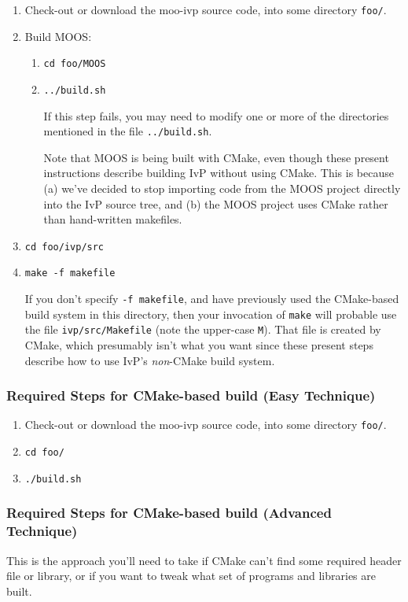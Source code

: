 \documentclass[letterpaper,10pt]{article}
\begin{document}
\begin{enumerate}
 \item Check-out or download the moo-ivp source code, into some directory \verb|foo/|.
 \item Build MOOS:
 \begin{enumerate}
  \renewcommand{\labelenumii}{\arabic{enumi}.\arabic{enumii}.}
   \item \verb|cd foo/MOOS|
   \item \verb|../build.sh|

	If this step fails, you may need to modify one or more of the directories
	mentioned in the file \verb|../build.sh|.

	Note that MOOS is being built with CMake, even though these present instructions
	describe building IvP without using CMake.  This is because (a) we've decided to
	stop importing code from the MOOS project directly into the IvP source tree, and
	(b) the MOOS project uses CMake rather than hand-written makefiles.

 \end{enumerate}

 \item \verb|cd foo/ivp/src|
 \item \verb|make -f makefile|

	If you don't specify \verb|-f makefile|, and have previously used the
	CMake-based build system in this directory, then your invocation of \verb|make|
	will probable use the file \verb|ivp/src/Makefile| (note the upper-case \verb|M|).
	That file is created by CMake, which presumably isn't what you want since these
	present steps describe how to use IvP's \textit{non}-CMake build system.

\end{enumerate}


\subsubsection{Required Steps for CMake-based build (Easy Technique)}
\begin{enumerate}
 \item Check-out or download the moo-ivp source code, into some directory \verb|foo/|.
 \item \verb|cd foo/|
 \item \verb|./build.sh|
\end{enumerate}

\subsubsection{Required Steps for CMake-based build (Advanced Technique)}
This is the approach you'll need to take if CMake can't find some required header
file or library, or if you want to tweak what set of programs and libraries are
built.
\end{document}
